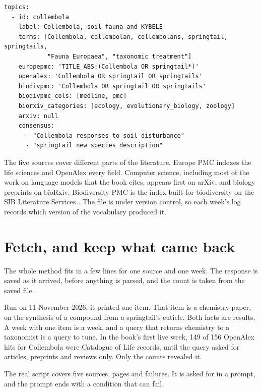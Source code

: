 \documentclass[11pt,a4paper]{article}
\begin{document}
\begin{lstlisting}[caption={One topic in config/interests.yml}]
topics:
  - id: collembola
    label: Collembola, soil fauna and KYBELE
    terms: [Collembola, collembolan, collembolans, springtail, springtails,
            "Fauna Europaea", "taxonomic treatment"]
    europepmc: 'TITLE_ABS:(Collembola OR springtail*)'
    openalex: 'Collembola OR springtail OR springtails'
    biodivpmc: 'Collembola OR springtail OR springtails'
    biodivpmc_cols: [medline, pmc]
    biorxiv_categories: [ecology, evolutionary_biology, zoology]
    arxiv: null
    consensus:
      - "Collembola responses to soil disturbance"
      - "springtail new species description"
\end{lstlisting}

The five sources cover different parts of the literature. Europe PMC indexes
the life sciences and OpenAlex every field. Computer science, including most
of the work on language models that the book cites, appears first on arXiv,
and biology preprints on bioRxiv. Biodiversity PMC is the index built for biodiversity on the SIB
Literature Services \parencite{pasche2026biodivpmc}.
The file is under version control, so each week's log records which version
of the vocabulary produced it.

\section{Fetch, and keep what came back}

The whole method fits in a few lines for one source and one week. The
response is saved as it arrived, before anything is parsed, and the count is
taken from the saved file.



Run on 11 November 2026, it printed one item. That item is a chemistry paper,
on the synthesis of a compound from a springtail's cuticle. Both facts are
results. A week with one item is a week, and a query that returns chemistry
to a taxonomist is a query to tune. In the book's first live week, 149 of 156
OpenAlex hits for Collembola were Catalogue of Life records, until the query
asked for articles, preprints and reviews only. Only the counts revealed it.

The real script covers five sources, pages and failures. It is asked for in a
prompt, and the prompt ends with a condition that can fail.
\end{document}
